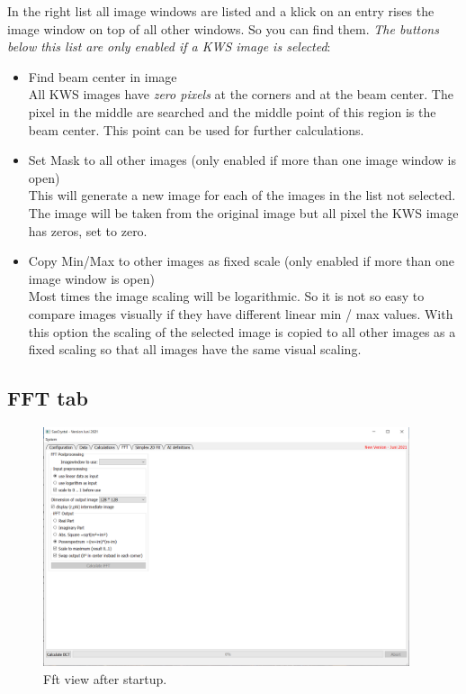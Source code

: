 \documentclass[11pt]{article} %
\begin{document}
In the right list all image windows are listed and a klick on an entry rises the image window on top of all other windows. So you can find them. {\it The buttons below this list are only enabled if a KWS image is selected}:
\begin{itemize}\itemsep0pt
\item Find beam center in image \\
	All KWS images have {\it zero pixels} at the corners and at the beam center. The pixel in the middle are searched and the middle point of this region is the beam center. This point can be used for further calculations.
\item Set Mask to all other images (only enabled if more than one image window is open) \\
	This will generate a new image for each of the images in the list not selected. The image will be taken from the original image but all pixel the KWS image has zeros, set to zero.
\item Copy Min/Max to other images as fixed scale (only enabled if more than one image window is open) \\
	Most times the image scaling will be logarithmic. So it is not so easy to compare images visually if they have different linear min / max values. With this option the scaling of the selected image is copied to all other images as a fixed scaling so that all images have the same visual scaling.
\end{itemize}


\subsection{FFT tab}

\begin{figure}[h]
 \centering
 \includegraphics[width=0.96\textwidth]{main-fft-start.png}
 \caption{Fft view after startup.}
 \label{fig:fftstart}
\end{figure}
\end{document}
